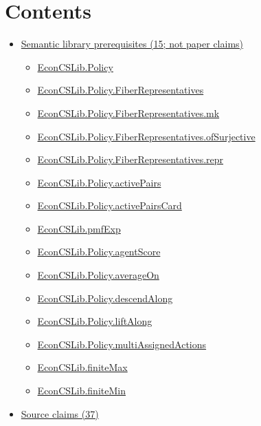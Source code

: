 \documentclass[10pt]{article}
\begin{document}
\section*{Contents}
\begin{itemize}[leftmargin=1.2em]
\item \hyperlink{library-section-c26db27dcc5f31c6}{Semantic library prerequisites (15; not paper claims)}
\begin{itemize}[leftmargin=1.2em]
\item \hyperlink{library-prerequisite-a044ec78dc3416bb}{EconCSLib.Policy}
\item \hyperlink{library-prerequisite-ae914c1008ad6876}{EconCSLib.Policy.FiberRepresentatives}
\item \hyperlink{library-prerequisite-4947c7fe50d6ca8c}{EconCSLib.Policy.FiberRepresentatives.mk}
\item \hyperlink{library-prerequisite-431408b14a56af5b}{EconCSLib.Policy.FiberRepresentatives.ofSurjective}
\item \hyperlink{library-prerequisite-f877c2e1ff5055d0}{EconCSLib.Policy.FiberRepresentatives.repr}
\item \hyperlink{library-prerequisite-3f5282c6cd6824d2}{EconCSLib.Policy.activePairs}
\item \hyperlink{library-prerequisite-adfb156708f820de}{EconCSLib.Policy.activePairsCard}
\item \hyperlink{library-prerequisite-e5c7eedc40c11b7a}{EconCSLib.pmfExp}
\item \hyperlink{library-prerequisite-5d1b9ed6dad7a9b5}{EconCSLib.Policy.agentScore}
\item \hyperlink{library-prerequisite-da90e4e59e052ad3}{EconCSLib.Policy.averageOn}
\item \hyperlink{library-prerequisite-01139ab74b03022e}{EconCSLib.Policy.descendAlong}
\item \hyperlink{library-prerequisite-09fbb0c526b44fa8}{EconCSLib.Policy.liftAlong}
\item \hyperlink{library-prerequisite-1181c0a9dbe29e4e}{EconCSLib.Policy.multiAssignedActions}
\item \hyperlink{library-prerequisite-ecc26a3133fdd38b}{EconCSLib.finiteMax}
\item \hyperlink{library-prerequisite-087e3287a5c76915}{EconCSLib.finiteMin}
\end{itemize}
\item \hyperlink{source-section-f10b5f68e4acf3dc}{Source claims (37)}
\begin{itemize}[leftmargin=1.2em]

\end{itemize}
\end{itemize}
\end{document}
